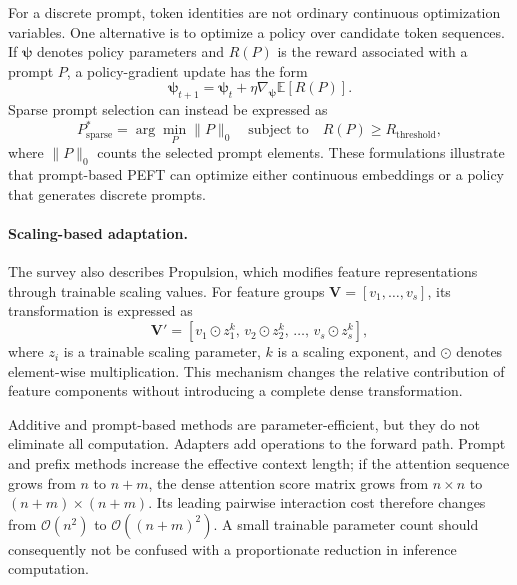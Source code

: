 For a discrete prompt, token identities are not ordinary continuous
optimization variables. One alternative is to optimize a policy over
candidate token sequences. If $\boldsymbol{\psi}$ denotes policy parameters
and $R(P)$ is the reward associated with a prompt $P$, a policy-gradient
update has the form
\begin{equation}
    \boldsymbol{\psi}_{t+1}
    =
    \boldsymbol{\psi}_{t}
    +
    \eta\nabla_{\boldsymbol{\psi}}
    \mathbb{E}[R(P)].
    \label{eq:peft-rlprompt}
\end{equation}
Sparse prompt selection can instead be expressed as
\begin{equation}
    P_{\mathrm{sparse}}^{*}
    =
    \arg\min_{P}\|P\|_0
    \quad
    \text{subject to}
    \quad
    R(P)\geq R_{\mathrm{threshold}},
    \label{eq:peft-sparse-prompt}
\end{equation}
where $\|P\|_0$ counts the selected prompt elements. These formulations
illustrate that prompt-based PEFT can optimize either continuous embeddings
or a policy that generates discrete prompts.

\paragraph{Scaling-based adaptation.}
The survey also describes Propulsion, which modifies feature representations
through trainable scaling values. For feature groups
$\mathbf{V}=[v_1,\ldots,v_s]$, its transformation is expressed as
\begin{equation}
    \mathbf{V}'
    =
    [v_1\odot z_1^k,\,
     v_2\odot z_2^k,\,
     \ldots,\,
     v_s\odot z_s^k],
    \label{eq:peft-propulsion}
\end{equation}
where $z_i$ is a trainable scaling parameter, $k$ is a scaling exponent, and
$\odot$ denotes element-wise multiplication. This mechanism changes the
relative contribution of feature components without introducing a complete
dense transformation.

Additive and prompt-based methods are parameter-efficient, but they do not
eliminate all computation. Adapters add operations to the forward path.
Prompt and prefix methods increase the effective context length; if the
attention sequence grows from $n$ to $n+m$, the dense attention score matrix
grows from $n\times n$ to $(n+m)\times(n+m)$. Its leading pairwise
interaction cost therefore changes from $\mathcal{O}(n^2)$ to
$\mathcal{O}((n+m)^2)$. A small trainable parameter count should consequently
not be confused with a proportionate reduction in inference computation.

